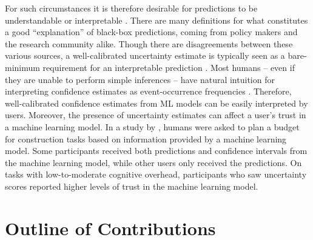 For such circumstances it is therefore desirable for predictions to be understandable or interpretable .
There are many definitions for what constitutes a good ``explanation'' of black-box predictions, coming from policy makers  and the research community  alike.
Though there are disagreements between these various sources, a well-calibrated uncertainty estimate is typically seen as a bare-minimum requirement for an interpretable prediction .
Most humans -- even if they are unable to perform simple inferences \cite{gigerenzer2003simple} -- have natural intuition for interpreting confidence estimates as event-occurrence frequencies \cite{cosmides1996humans,hoffrage1998using}.
Therefore, well-calibrated confidence estimates from ML models can be easily interpreted by users.
Moreover, the presence of uncertainty estimates can affect a user's trust in a machine learning model.
In a study by \citet{zhou2017effects}, humans were asked to plan a budget for construction tasks based on information provided by a machine learning model.
Some participants received both predictions and confidence intervals from the machine learning model, while other users only received the predictions.
On tasks with low-to-moderate cognitive overhead, participants who saw uncertainty scores reported higher levels of trust in the machine learning model.

\section{Outline of Contributions}
